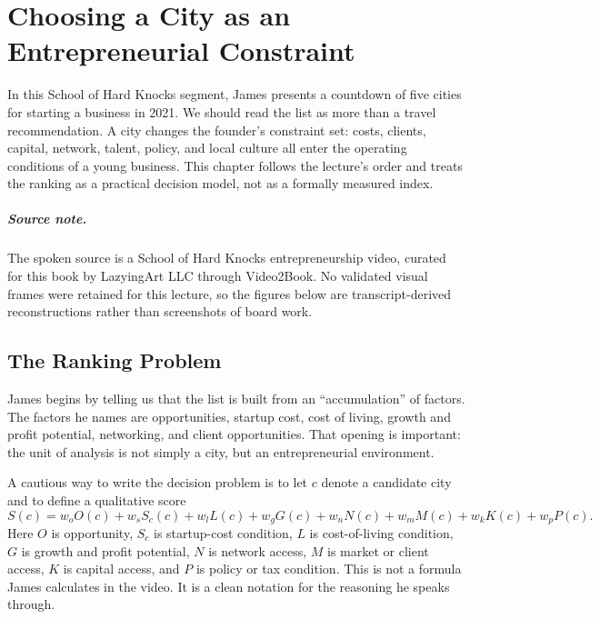 \chapter{Choosing a City as an Entrepreneurial Constraint}

In this School of Hard Knocks segment, James presents a countdown of five cities for starting a business in 2021. We should read the list as more than a travel recommendation. A city changes the founder's constraint set: costs, clients, capital, network, talent, policy, and local culture all enter the operating conditions of a young business. This chapter follows the lecture's order and treats the ranking as a practical decision model, not as a formally measured index.

\paragraph{Source note.}
The spoken source is a School of Hard Knocks entrepreneurship video, curated for this book by LazyingArt LLC through Video2Book. No validated visual frames were retained for this lecture, so the figures below are transcript-derived reconstructions rather than screenshots of board work.

\section{The Ranking Problem}

James begins by telling us that the list is built from an ``accumulation'' of factors. The factors he names are opportunities, startup cost, cost of living, growth and profit potential, networking, and client opportunities. That opening is important: the unit of analysis is not simply a city, but an entrepreneurial environment.

A cautious way to write the decision problem is to let \(c\) denote a candidate city and to define a qualitative score
\begin{equation}
S(c)
=
w_oO(c)
+w_sS_c(c)
+w_lL(c)
+w_gG(c)
+w_nN(c)
+w_mM(c)
+w_kK(c)
+w_pP(c).
\end{equation}
Here \(O\) is opportunity, \(S_c\) is startup-cost condition, \(L\) is cost-of-living condition, \(G\) is growth and profit potential, \(N\) is network access, \(M\) is market or client access, \(K\) is capital access, and \(P\) is policy or tax condition. This is not a formula James calculates in the video. It is a clean notation for the reasoning he speaks through.

